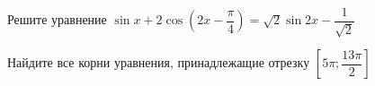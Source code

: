 \begin{ex}
	\begin{condition}
		\begin{enumcols}[label=\asbuk*)]
			\item Решите уравнение \(  \sin x + 2\cos{\left(2x - \dfrac{\pi}{4}\right)} = \sqrt{2}\sin 2x - \dfrac{1}{\sqrt{2}} \)
			\item Найдите все корни уравнения, принадлежащие отрезку \( \left[5\pi;\dfrac{13\pi}{2}\right] \)
		\end{enumcols}
	\end{condition}
\end{ex}